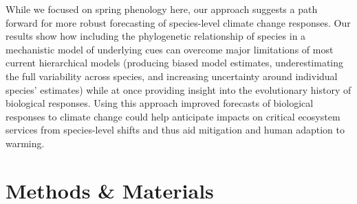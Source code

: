 \documentclass[11pt]{article}
\begin{document}
While we focused on spring phenology here, our approach suggests a path forward for more robust forecasting of species-level climate change responses. Our results show how including the phylogenetic relationship of species in a mechanistic model of underlying cues can overcome major limitations of most current hierarchical models (producing biased model estimates, underestimating the full variability across species, and increasing uncertainty around individual species' estimates) while at once providing insight into the evolutionary history of biological responses. Using this approach improved forecasts of biological responses to climate change could help anticipate impacts on critical ecosystem services from species-level shifts and thus aid mitigation and human adaption to warming. 




\clearpage
\section*{Methods \& Materials} 

\end{document}
